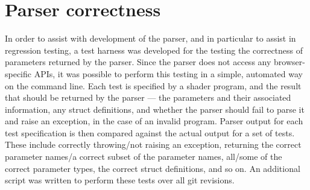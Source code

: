 \documentclass[12pt,twoside,notitlepage]{report}
\begin{document}
\section{Parser correctness}
In order to assist with development of the parser, and in particular to assist in regression testing, a test harness was developed for the testing the correctness of parameters returned by the parser. Since the parser does not access any browser-specific APIs, it was possible to perform this testing in a simple, automated way on the command line. Each test is specified by a shader program, and the result that should be returned by the parser --- the parameters and their associated information, any struct definitions, and whether the parser should fail to parse it and raise an exception, in the case of an invalid program. Parser output for each test specification is then compared against the actual output for a set of tests. These include correctly throwing/not raising an exception, returning the correct parameter names/a correct subset of the parameter names, all/some of the correct parameter types, the correct struct definitions, and so on. An additional script was written to perform these tests over all git revisions. 
\end{document}
